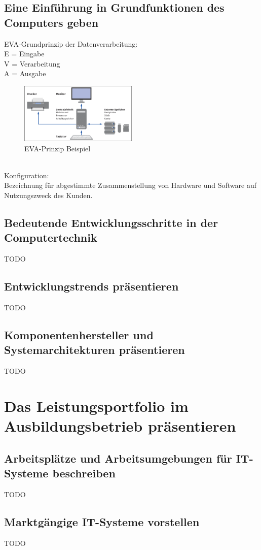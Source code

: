 \documentclass[11pt]{article}
\begin{document}
\subsection{Eine Einführung in Grundfunktionen des Computers geben}
    EVA-Grundprinzip der Datenverarbeitung:\\
    E = Eingabe\\
    V = Verarbeitung\\
    A = Ausgabe
    \begin{figure}[h]
        \centering
        \includegraphics[width=0.5\textwidth]{./images/2.1.1_konfiguration.png}
        \caption{EVA-Prinzip Beispiel}
        \label{fig:EVA-Prinzip}
    \end{figure}\\
    Konfiguration:\\
    Bezeichnung für abgestimmte Zusammenstellung von Hardware und Software auf Nutzungszweck des Kunden.
\subsection{Bedeutende Entwicklungsschritte in der Computertechnik}
    TODO
\subsection{Entwicklungstrends präsentieren}
    TODO
\subsection{Komponentenhersteller und Systemarchitekturen präsentieren}
    TODO

\newpage
\section{Das Leistungsportfolio im Ausbildungsbetrieb präsentieren}
\subsection{Arbeitsplätze und Arbeitsumgebungen für IT-Systeme beschreiben}
    TODO
\subsection{Marktgängige IT-Systeme vorstellen}
    TODO
\end{document}
